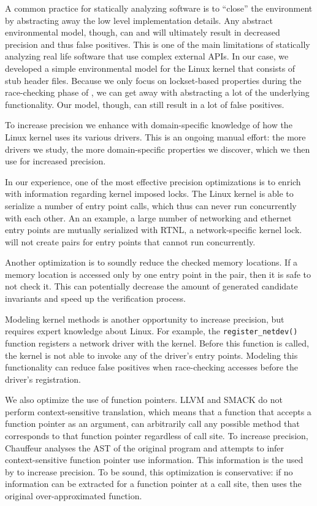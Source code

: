 A common practice for statically analyzing software is to ``close'' the environment by abstracting away the low level implementation details. Any abstract environmental model, though, can and will ultimately result in decreased precision and thus false positives. This is one of the main limitations of statically analyzing real life software that use complex external APIs. In our case, we developed a simple environmental model for the Linux kernel that consists of stub header files. Because we only focus on lockset-based properties during the race-checking phase of \whoop, we can get away with abstracting a lot of the underlying functionality. Our model, though, can still result in a lot of false positives.

To increase precision we enhance \whoop with domain-specific knowledge of how the Linux kernel uses its various drivers. This is an ongoing manual effort: the more drivers we study, the more domain-specific properties we discover, which we then use for increased precision.

In our experience, one of the most effective precision optimizations is to enrich \whoop with information regarding kernel imposed locks. The Linux kernel is able to serialize a number of entry point calls, which thus can never run concurrently with each other. An an example, a large number of networking and ethernet entry points are mutually serialized with RTNL, a network-specific kernel lock. \whoop will not create pairs for entry points that cannot run concurrently.

Another optimization is to soundly reduce the checked memory locations. If a memory location is accessed only by one entry point in the pair, then it is safe to not check it. This can potentially decrease the amount of generated candidate invariants and speed up the verification process.

Modeling kernel methods is another opportunity to increase precision, but requires expert knowledge about Linux. For example, the \texttt{register\_netdev()} function registers a network driver with the kernel. Before this function is called, the kernel is not able to invoke any of the driver's entry points. Modeling this functionality can reduce false positives when race-checking accesses before the driver's registration.

We also optimize the use of function pointers. LLVM and SMACK do not perform context-sensitive translation, which means that a function that accepts a function pointer as an argument, can arbitrarily call any possible method that corresponds to that function pointer regardless of call site. To increase precision, Chauffeur analyses the AST of the original program and attempts to infer context-sensitive function pointer use information. This information is the used by \whoop to increase precision. To be sound, this optimization is conservative: if no information can be extracted for a function pointer at a call site, then \whoop uses the original over-approximated function.

